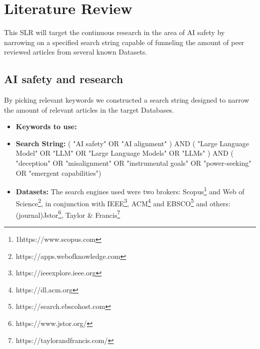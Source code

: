 \chapter{Literature Review}\label{chap:literature_review}

This SLR will target the continuous research in the area of AI safety by narrowing on a specified search string capable of funneling the amount of peer reviewed articles from several known Datasets.

\section{AI safety and research}

By picking relevant keywords we constructed a search string designed to narrow the amount of relevant articles in the target Databases.

\begin{itemize}
    \item \textbf{Keywords to use:} 
    \item \textbf{Search String:} ( "AI safety" OR "AI alignment" ) AND ( "Large Language Model" OR "LLM" OR "Large Language Models" OR "LLMs" ) AND ( "deception" OR "misalignment" OR "instrumental goals" OR "power-seeking" OR "emergent capabilities")
    \item \textbf{Datasets:} The search engines used were two brokers: Scopus\footnote{1https://www.scopus.com} and Web of Science\footnote{https://apps.webofknowledge.com}, in conjunction with IEEE\footnote{https://ieeexplore.ieee.org}, ACM\footnote{https://dl.acm.org} and EBSCO\footnote{https://search.ebscohost.com} and others: (journal)Jstor\footnote{https://www.jstor.org/}, Taylor \& Francis\footnote{https://taylorandfrancis.com/} %
\end{itemize}


